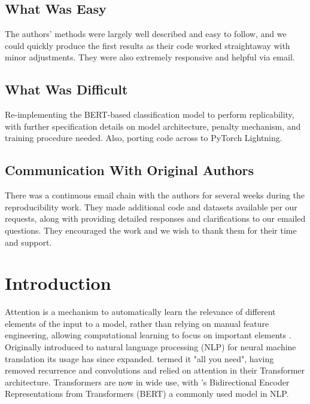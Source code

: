 \subsection*{What Was Easy}
The authors' methods were largely well described and easy to follow, and we could quickly produce the first results as their code worked straightaway with minor adjustments. They were also extremely responsive and helpful via email.

\subsection*{What Was Difficult}
Re-implementing the BERT-based classification model to perform replicability, with further specification details on model architecture, penalty mechanism, and training procedure needed. Also, porting code across to PyTorch Lightning.

\subsection*{Communication With Original Authors}
There was a continuous email chain with the authors for several weeks during the reproducibility work. They made additional code and datasets available per our requests, along with providing detailed responses and clarifications to our emailed questions. They encouraged the work and we wish to thank them for their time and support.

\newpage


\section{Introduction}
Attention is a mechanism to automatically learn the relevance of different elements of the input to a model, rather than relying on manual feature engineering, allowing computational learning to focus on important elements \citep{galassi2020attention}.
Originally introduced to natural language processing (NLP) for neural machine translation \citep{bahdanau2014neural} its usage has since expanded. \citet{vaswani2017attention} termed it "all you need", having removed recurrence and convolutions and relied on attention in their Transformer architecture. Transformers are now in wide use, with \citet{devlin2018bert}'s Bidirectional Encoder Representations from Transformers (BERT) a commonly used model in NLP.

